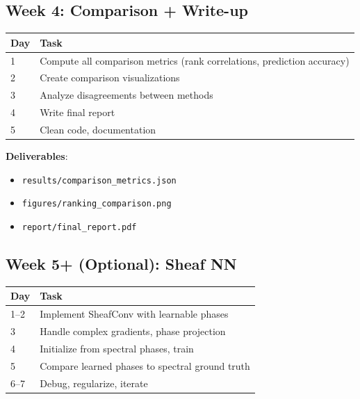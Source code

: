 \documentclass[11pt, a4paper]{article}
\begin{document}
\subsection{Week 4: Comparison + Write-up}

\begin{center}
\begin{tabular}{lp{10cm}}
\toprule
\textbf{Day} & \textbf{Task} \\
\midrule
1 & Compute all comparison metrics (rank correlations, prediction accuracy) \\
2 & Create comparison visualizations \\
3 & Analyze disagreements between methods \\
4 & Write final report \\
5 & Clean code, documentation \\
\bottomrule
\end{tabular}
\end{center}

\textbf{Deliverables}:
\begin{itemize}
    \item \texttt{results/comparison\_metrics.json}
    \item \texttt{figures/ranking\_comparison.png}
    \item \texttt{report/final\_report.pdf}
\end{itemize}

\subsection{Week 5+ (Optional): Sheaf NN}

\begin{center}
\begin{tabular}{lp{10cm}}
\toprule
\textbf{Day} & \textbf{Task} \\
\midrule
1--2 & Implement SheafConv with learnable phases \\
3 & Handle complex gradients, phase projection \\
4 & Initialize from spectral phases, train \\
5 & Compare learned phases to spectral ground truth \\
6--7 & Debug, regularize, iterate \\
\bottomrule
\end{tabular}
\end{center}

\end{document}
